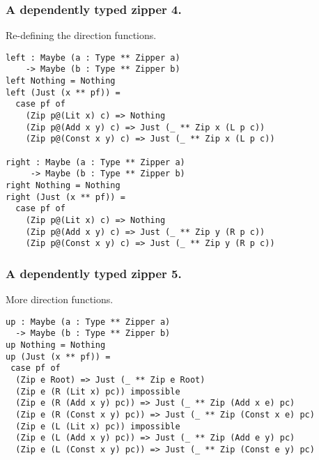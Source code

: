 \documentclass{beamer}
\begin{document}
\begin{frame}[fragile]
  \frametitle{A dependently typed zipper 4.}
  \begin{block}{Re-defining the direction functions.}
    \begin{verbatim}
left : Maybe (a : Type ** Zipper a) 
    -> Maybe (b : Type ** Zipper b)
left Nothing = Nothing
left (Just (x ** pf)) = 
  case pf of
    (Zip p@(Lit x) c) => Nothing
    (Zip p@(Add x y) c) => Just (_ ** Zip x (L p c)) 
    (Zip p@(Const x y) c) => Just (_ ** Zip x (L p c)) 

right : Maybe (a : Type ** Zipper a) 
     -> Maybe (b : Type ** Zipper b)
right Nothing = Nothing
right (Just (x ** pf)) = 
  case pf of
    (Zip p@(Lit x) c) => Nothing 
    (Zip p@(Add x y) c) => Just (_ ** Zip y (R p c)) 
    (Zip p@(Const x y) c) => Just (_ ** Zip y (R p c)) 
     \end{verbatim}
  \end{block}
\end{frame}

\begin{frame}[fragile]
  \frametitle{A dependently typed zipper 5.}
  \begin{block}{More direction functions.}
    \begin{verbatim}
up : Maybe (a : Type ** Zipper a) 
  -> Maybe (b : Type ** Zipper b)
up Nothing = Nothing
up (Just (x ** pf)) =
 case pf of
  (Zip e Root) => Just (_ ** Zip e Root)
  (Zip e (R (Lit x) pc)) impossible
  (Zip e (R (Add x y) pc)) => Just (_ ** Zip (Add x e) pc)
  (Zip e (R (Const x y) pc)) => Just (_ ** Zip (Const x e) pc)
  (Zip e (L (Lit x) pc)) impossible
  (Zip e (L (Add x y) pc)) => Just (_ ** Zip (Add e y) pc)
  (Zip e (L (Const x y) pc)) => Just (_ ** Zip (Const e y) pc)
    \end{verbatim}
  \end{block}
\end{frame}
\end{document}
